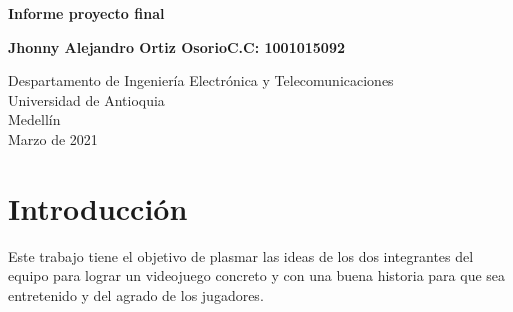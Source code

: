 \documentclass{article}
\begin{document}
\begin{titlepage}
    \begin{center}
        \vspace*{1cm}
            
        \Huge
        \textbf{Informe proyecto final }
            
        \vspace{0.5cm}
        \LARGE
            
        \vspace{1.5cm}
            
        \textbf{Jhonny Alejandro Ortiz Osorio\newline C.C: 1001015092}
        
        \vfill
            
        \vspace{0.8cm}
            
        \Large
        Despartamento de Ingeniería Electrónica y Telecomunicaciones\\
        Universidad de Antioquia\\
        Medellín\\
        Marzo de 2021
            
    \end{center}
\end{titlepage}

\tableofcontents
\newpage
\section{Introducción}\label{intro}
Este trabajo tiene el objetivo de plasmar las ideas de los dos integrantes del equipo para lograr un videojuego concreto y con una buena historia para que sea entretenido y del agrado de los jugadores.
\end{document}
